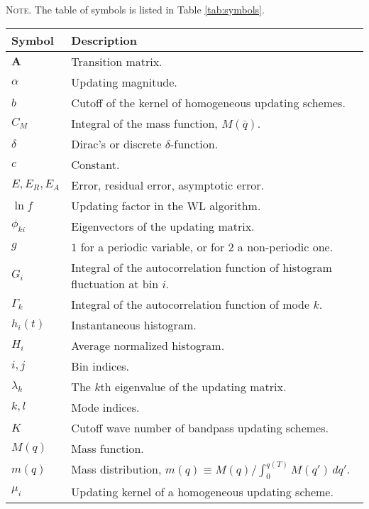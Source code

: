 \documentclass[reprint, superscriptaddress, floatfix]{revtex4-1}
\newcommand{\note}[1]{{\color{DarkGreen}\footnotesize \textsc{Note.} #1}}
\newcommand{\Err}{E}
\begin{document}
\note{The table of symbols is listed in Table \ref{tab:symbols}.
  \begin{table*}
  \footnotesize
  \centering
  \rowcolors{1}{white}{LightGray}
  \setlength{\tabcolsep}{4pt} %
  \caption{\label{tab:symbols}
    Table of symbols.}
  \begin{tabular}{l | p{12cm} }
    Symbol          &   Description \\
    \hline
    $\mathbf{A}$    &   Transition matrix. \\
    $\alpha$        &   Updating magnitude. \\
    $b$             &   Cutoff of the kernel of homogeneous updating schemes. \\
    $C_M$           &   Integral of the mass function, $M(\bar q)$.  \\
    $\delta$        &   Dirac's or discrete $\delta$-function. \\
    $c$             &   Constant. \\
    $\Err, \Err_R, \Err_A$          &   Error, residual error, asymptotic error. \\
    $\ln f$         &   Updating factor in the WL algorithm.  \\
    $\phi_{ki}$     &   Eigenvectors of the updating matrix. \\
    $g$             &   $1$ for a periodic variable, or for $2$ a non-periodic one. \\
    $G_i$           &   Integral of the autocorrelation function of histogram fluctuation at bin $i$. \\
    $\Gamma_k$      &   Integral of the autocorrelation function of mode $k$. \\
    $h_i(t)$        &   Instantaneous histogram.  \\
    $H_i$           &   Average normalized histogram.  \\
    $i, j$          &   Bin indices. \\
    $\lambda_k$     &   The $k$th eigenvalue of the updating matrix. \\
    $k, l$          &   Mode indices. \\
    $K$             &   Cutoff wave number of bandpass updating schemes.  \\
    $M(q)$          &   Mass function.   \\
    $m(q)$          &   Mass distribution,
                        $m(q) \equiv M(q)/\int_0^{ q(T) } M(q') \, dq'$.  \\
    $\mu_i$         &   Updating kernel of a homogeneous updating scheme. \\

\end{tabular}
\end{table*}}
\end{document}
